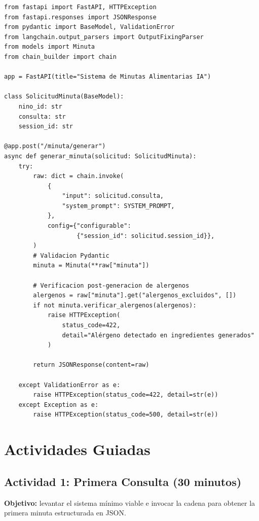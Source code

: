 \documentclass[12pt,a4paper]{article}
\begin{document}
\begin{lstlisting}[style=pythonstyle, caption={api.py --- Exposición del sistema como API REST}]
from fastapi import FastAPI, HTTPException
from fastapi.responses import JSONResponse
from pydantic import BaseModel, ValidationError
from langchain.output_parsers import OutputFixingParser
from models import Minuta
from chain_builder import chain

app = FastAPI(title="Sistema de Minutas Alimentarias IA")

class SolicitudMinuta(BaseModel):
    nino_id: str
    consulta: str
    session_id: str

@app.post("/minuta/generar")
async def generar_minuta(solicitud: SolicitudMinuta):
    try:
        raw: dict = chain.invoke(
            {
                "input": solicitud.consulta,
                "system_prompt": SYSTEM_PROMPT,
            },
            config={"configurable":
                    {"session_id": solicitud.session_id}},
        )
        # Validacion Pydantic
        minuta = Minuta(**raw["minuta"])

        # Verificacion post-generacion de alergenos
        alergenos = raw["minuta"].get("alergenos_excluidos", [])
        if not minuta.verificar_alergenos(alergenos):
            raise HTTPException(
                status_code=422,
                detail="Alérgeno detectado en ingredientes generados"
            )

        return JSONResponse(content=raw)

    except ValidationError as e:
        raise HTTPException(status_code=422, detail=str(e))
    except Exception as e:
        raise HTTPException(status_code=500, detail=str(e))
\end{lstlisting}

\section{Actividades Guiadas}
\label{sec:actividades}

\subsection{Actividad 1: Primera Consulta (30 minutos)}

\textbf{Objetivo:} levantar el sistema mínimo viable e invocar la cadena
para obtener la primera minuta estructurada en JSON.
\end{document}

